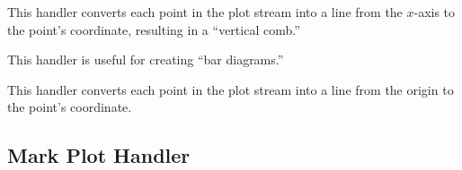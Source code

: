\begin{command}{\pgfplothandlerycomb}
  This handler converts each point in the plot stream into a line from
  the $x$-axis to the point's coordinate, resulting in a ``vertical
  comb.''
  
  This handler is useful for creating ``bar diagrams.''
\begin{codeexample}[]
\end{codeexample}
\end{command}

\begin{command}{\pgfplothandlerpolarcomb}
  This handler converts each point in the plot stream into a line from
  the origin to the point's coordinate.
  
\begin{codeexample}[]
\end{codeexample}
\end{command}

\subsection{Mark Plot Handler}

\label{section-plot-marks}

